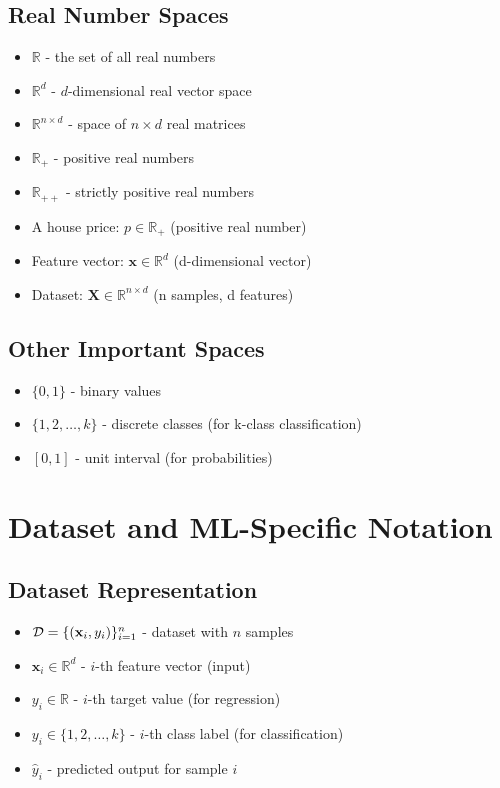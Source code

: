 \documentclass{article}
\providecommand{\vx}{\mathbf{x}}
\providecommand{\mX}{\mathbf{X}}
\providecommand{\Real}{\mathbb{R}}
\begin{document}
\subsection{Real Number Spaces}
\begin{itemize}
    \item $\Real$ - the set of all real numbers
    \item $\Real^d$ - $d$-dimensional real vector space
    \item $\Real^{n \times d}$ - space of $n \times d$ real matrices
    \item $\Real_+$ - positive real numbers
    \item $\Real_{++}$ - strictly positive real numbers
\end{itemize}

\begin{tcolorbox}[colback=purple!5!white,colframe=purple!75!black,title=Space Examples]
\begin{itemize}
    \item A house price: $p \in \Real_+$ (positive real number)
    \item Feature vector: $\vx \in \Real^d$ (d-dimensional vector)
    \item Dataset: $\mX \in \Real^{n \times d}$ (n samples, d features)
\end{itemize}
\end{tcolorbox}

\subsection{Other Important Spaces}
\begin{itemize}
    \item $\{0, 1\}$ - binary values
    \item $\{1, 2, \ldots, k\}$ - discrete classes (for k-class classification)
    \item $[0, 1]$ - unit interval (for probabilities)
\end{itemize}

\section{Dataset and ML-Specific Notation}

\subsection{Dataset Representation}
\begin{itemize}
    \item $\cD = \{(\vx_i, y_i)\}_{i=1}^n$ - dataset with $n$ samples
    \item $\vx_i \in \Real^d$ - $i$-th feature vector (input)
    \item $y_i \in \Real$ - $i$-th target value (for regression)
    \item $y_i \in \{1, 2, \ldots, k\}$ - $i$-th class label (for classification)
    \item $\hat{y}_i$ - predicted output for sample $i$
\end{itemize}
\end{document}
